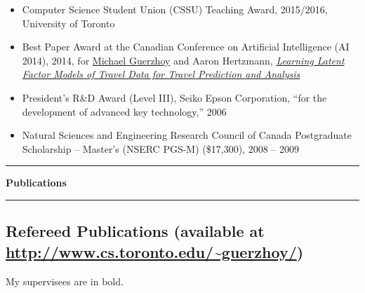 \documentclass[letterpaper,11pt]{article}
\newcommand{\resitem}[1]{\item #1 \vspace{-2pt}}
\newcommand{\resheading}[1]{%
  \vspace{10pt}%
  \noindent\textcolor{accent}{\rule{3pt}{12pt}}\hspace{6pt}%
  {\large \textbf{\textcolor{accent}{#1}}}%
  \vspace{2pt}%
  \par\noindent\textcolor{accent!30}{\rule{\textwidth}{0.5pt}}%
  \vspace{2pt}%
}
\begin{document}
\begin{itemize}
	\resitem{Computer Science Student Union (CSSU) Teaching Award, 2015/2016, University of Toronto}
	\resitem{Best Paper Award at the Canadian Conference on Artificial Intelligence (AI 2014), 2014, for \underline{Michael Guerzhoy} and Aaron Hertzmann, \href{http://www.cs.toronto.edu/~guerzhoy/humantravel/}{\textit{\href{http://www.cs.toronto.edu/~guerzhoy/humantravel/}{Learning Latent Factor Models of Travel Data for Travel Prediction and Analysis}}}}
	\resitem{President's R\&D Award (Level III), Seiko Epson Corporation, ``for the development of advanced key technology,'' 2006}
	\resitem{Natural Sciences and Engineering Research Council of Canada Postgraduate Scholarship -- Master's (NSERC PGS-M) (\$17,300), 2008 -- 2009}		
\end{itemize}



\resheading{Publications}

\vspace{-0.15in}\subsection*{Refereed Publications {\mdseries(available at \hyperref{http://www.cs.toronto.edu/~guerzhoy/}{}{}{http://www.cs.toronto.edu/\textasciitilde guerzhoy/}})}


My supervisees are in bold. 
\end{document}
